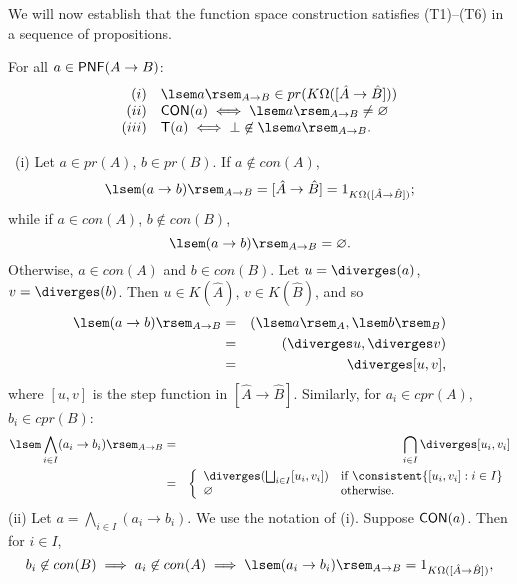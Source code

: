 We will now establish that the function space construction satisfies (T1)--(T6) in a sequence of propositions.

\begin{proposition}[T1]
\label{funT1}
For all $a \in {\sf PNF}(A \rightarrow B)$:
\[ \begin{array}{rl}
(i)   & \lsem a \rsem_{A \rightarrow B} \in pr(K \Omega ([\hat{A} \rightarrow \hat{B}])) \\
(ii)  & {\sf CON}(a) \; \Longleftrightarrow \; \lsem a \rsem_{A \rightarrow B} \neq \varnothing \\
(iii) & {\sf T}(a) \; \Longleftrightarrow \; \bot \not\in \lsem a \rsem_{A \rightarrow B}.
\end{array} \]
\end{proposition}

\proof\ (i) Let $a \in pr(A)$, $b \in pr(B)$. If $a \not\in con(A)$,
\[ \lsem (a \rightarrow b) \rsem_{A \rightarrow B} = [\hat{A} \rightarrow \hat{B}] = 1_{K\Omega ([\hat{A} \rightarrow \hat{B}])}; \]
while if $a \in con(A)$, $b \not\in con(B)$, 
\[ \lsem (a \rightarrow b) \rsem_{A \rightarrow B} = \varnothing . \]
Otherwise, $a \in con(A)$ and $b \in con(B)$. 
Let $u = \diverges (a)$, $v = \diverges (b)$. 
Then $u \in K(\hat{A})$, $v \in K(\hat{B})$, and so
\begin{eqnarray*}
\lsem (a \rightarrow b) \rsem_{A \rightarrow B} & = & (\lsem a \rsem_{A}, \lsem b \rsem_{B}) \\
& = & (\diverges u, \diverges v) \\
& = & \diverges [u, v],
\end{eqnarray*} 
where $[u, v]$ is the step function in $[\hat{A} \rightarrow \hat{B}]$. Similarly, for $a_{i} \in cpr(A)$, $b_{i} \in cpr(B)$:
\begin{eqnarray*}
\lsem \bigwedge_{i \in I}(a_{i} \rightarrow b_{i}) \rsem_{A \rightarrow B} & = & \bigcap_{i \in I} \diverges [u_{i}, v_{i}] \\
& = & \left\{ \begin{array}{ll}
               \diverges ( \bigsqcup_{i \in I}[u_{i}, v_{i}]) & \mbox{if 
               $\consistent \{[u_{i}, v_{i}] : i \in I \}$} \\
               \varnothing & \mbox{otherwise.}
               \end{array}
      \right.
\end{eqnarray*}
(ii) Let $a = \bigwedge_{i \in I}(a_{i} \rightarrow b_{i})$. We use the notation of (i). Suppose ${\sf CON}(a)$. Then for $i \in I$,
\[ b_{i} \not\in con(B) \; \Longrightarrow \; a_{i} \not\in con(A) \; \Longrightarrow \; \lsem (a_{i} \rightarrow b_{i}) \rsem_{A \rightarrow B} = 1_{K\Omega ([\hat{A} \rightarrow \hat{B}])}, \]

